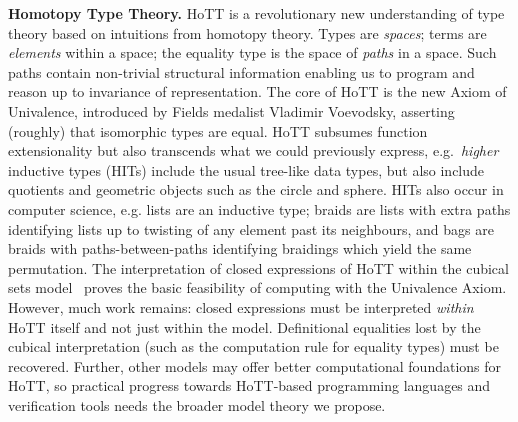 \documentclass[a4paper,11pt]{article}
\begin{document}
{\bf Homotopy Type Theory.} HoTT is a revolutionary new understanding of
type theory based on intuitions from homotopy theory. Types are
\emph{spaces}; terms are \emph{elements} within a space; the equality
type is the space of \emph{paths} in a space. Such paths contain
non-trivial structural information enabling us to program and reason up to invariance of
representation. The core of HoTT is the new Axiom of Univalence,
introduced by Fields medalist Vladimir Voevodsky, asserting (roughly)
that isomorphic types are equal. HoTT subsumes function extensionality
but also transcends what we could previously express, e.g.\
\emph{higher} inductive types (HITs) include the usual tree-like data
types, but also include quotients \cite{alti:mpc04} and geometric
objects such as the circle and sphere. HITs also occur in computer
science, e.g. lists are an inductive type; braids are lists with extra
paths identifying lists up to twisting of any element past its
neighbours, and bags are braids with paths-between-paths identifying
braidings which yield the same permutation. 
The interpretation of closed expressions of HoTT within the cubical
sets model~\cite{BezemM:cubsmt} proves the basic feasibility of computing
with the Univalence Axiom. However, much work remains: closed
expressions  must be interpreted  \emph{within} HoTT itself and 
not just within the model. Definitional equalities lost by the cubical interpretation (such as
the computation rule for equality types) must be recovered. Further, other models may
offer better computational foundations for HoTT, so practical progress
towards HoTT-based programming languages and verification tools needs
the broader model theory we propose.











\end{document}
